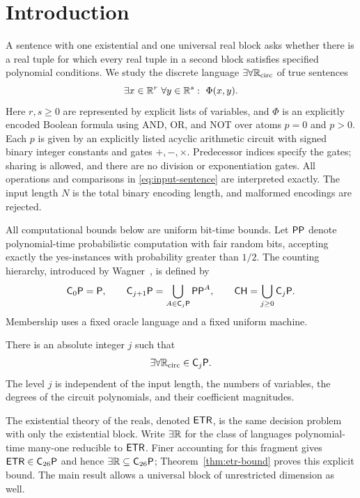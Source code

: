 \section{Introduction}\label{sec:introduction}

A sentence with one existential and one universal real block asks whether
there is a real tuple for which every real tuple in a second block satisfies
specified polynomial conditions. We study the discrete language
$\exists\forall\mathbb R_{\mathrm{circ}}$ of true sentences
\begin{equation}\label{eq:input-sentence}
 \exists x\in\mathbb R^r\ \forall y\in\mathbb R^s:\ \Phi(x,y).
\end{equation}
Here $r,s\ge0$ are represented by explicit lists of variables, and $\Phi$
is an explicitly encoded Boolean formula using AND, OR, and NOT over atoms
$p=0$ and $p>0$. Each $p$ is given by an explicitly listed acyclic arithmetic
circuit with signed binary integer constants and gates $+,-,\times$.
Predecessor indices specify the gates; sharing is allowed, and there are
no division or exponentiation gates. All operations and comparisons in
\eqref{eq:input-sentence} are interpreted exactly. The input length $N$
is the total binary encoding length, and malformed encodings are rejected.

All computational bounds below are uniform bit-time bounds. Let $\mathsf{PP}$
denote polynomial-time probabilistic computation with fair random bits,
accepting exactly the yes-instances with probability greater than $1/2$.
The counting hierarchy, introduced by Wagner~\cite{Wagner1986}, is defined by
\[
 \mathsf C_{0}\mathsf P=\mathsf P,\qquad
 \mathsf C_{j+1}\mathsf P=\bigcup_{A\in\mathsf C_{j}\mathsf P}\mathsf{PP}^A,
 \qquad \mathsf{CH}=\bigcup_{j\ge0}\mathsf C_{j}\mathsf P.
\]
Membership uses a fixed oracle language and a fixed uniform machine.

\begin{theorem}\label{thm:main}
There is an absolute integer $j$ such that
\[
                         \exists\forall\mathbb R_{\mathrm{circ}}\in\mathsf C_{j}\mathsf P.
\]
The level $j$ is independent of the input length, the numbers of variables,
the degrees of the circuit polynomials, and their coefficient magnitudes.
\end{theorem}

The existential theory of the reals, denoted $\mathsf{ETR}$, is the same decision
problem with only the existential block. Write $\exists\mathbb R$ for the class
of languages polynomial-time many-one reducible to $\mathsf{ETR}$. Finer
accounting for this fragment gives $\mathsf{ETR}\in\mathsf C_{26}\mathsf P$ and hence
$\exists\mathbb R\subseteq\mathsf C_{26}\mathsf P$; Theorem~\ref{thm:etr-bound} proves this
explicit bound. The main result allows a universal block of unrestricted
dimension as well.

